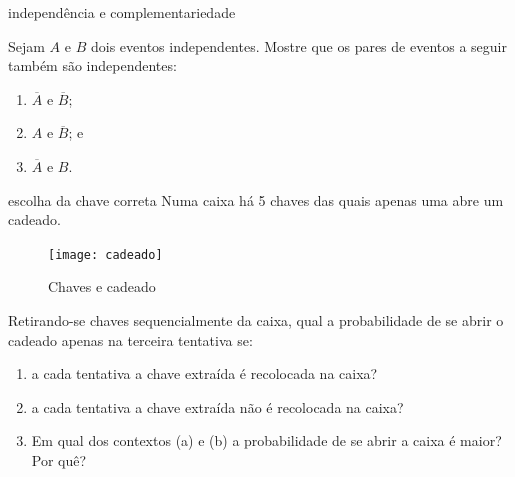 \begin{task}{independência e complementariedade}


Sejam \(A\) e \(B\) dois eventos independentes.  Mostre que os pares de eventos a seguir também são independentes:
\begin{enumerate}
\item {} 
\(\overline{A}\) e \(\overline{B}\);

\item {} 
\(A\) e \(\overline{B}\); e

\item {} 
\(\overline{A}\) e \(B\).

\end{enumerate}
\end{task}

\begin{task}{escolha da chave correta}
Numa caixa há 5 chaves das quais apenas uma abre um cadeado.

\begin{figure}[H]
\centering
\texttt{[image: cadeado]}

\caption{Chaves e cadeado}
\label{}
\end{figure}
Retirando-se chaves sequencialmente da caixa, qual a probabilidade de se abrir o cadeado apenas na terceira tentativa se:
\begin{enumerate}
\item a cada tentativa a chave extraída é recolocada na caixa?
\item a cada tentativa a chave extraída não é recolocada na caixa?
\item Em qual dos contextos (a) e (b) a probabilidade de se abrir a caixa é maior? Por quê?
\end{enumerate}

\end{task}

